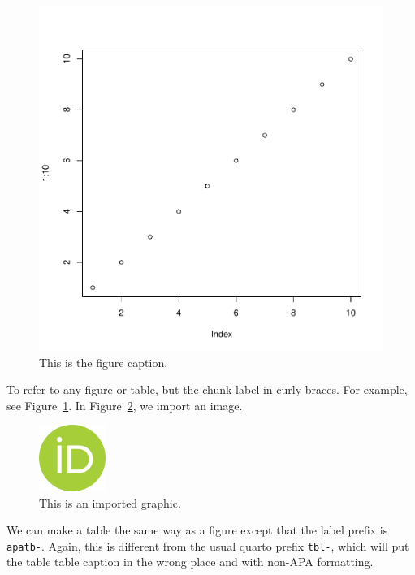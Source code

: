 \documentclass[
  man,
  floatsintext,
  colorlinks=true,linkcolor=blue,citecolor=blue,urlcolor=blue,biblatex]{apa7}
\begin{document}
\begin{figure}[h!]
\caption{This is the figure caption.}
\label{apafg-myplot}
\includegraphics[width=6.5 in]{template_files/figure-pdf/apafg-myplot-1.pdf}




\end{figure}

To refer to any figure or table, but the chunk label in curly braces.
For example, see Figure~\ref{apafg-myplot}. In
Figure~\ref{apafg-importedgraphic}, we import an image.

\begin{figure}[h!]
\caption{This is an imported graphic.}
\label{apafg-importedgraphic}
\includegraphics[width=0.85in]{orcid.png}




\end{figure}

We can make a table the same way as a figure except that the label
prefix is \texttt{apatb-}. Again, this is different from the usual
quarto prefix \texttt{tbl-}, which will put the table table caption in
the wrong place and with non-APA formatting.
\end{document}
